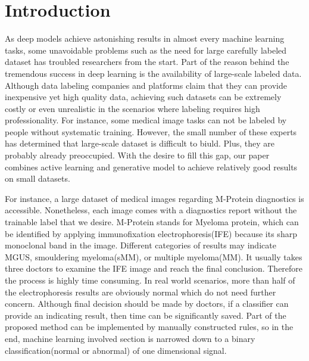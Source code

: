 \documentclass[10pt,twocolumn,letterpaper]{article}
\begin{document}
\section{Introduction}

\par As deep models achieve astonishing results in almost every machine learning tasks, some unavoidable problems such as the need for large carefully labeled dataset has troubled researchers from the start. Part of the reason behind the tremendous success in deep learning is the availability of large-scale labeled data\cite{sun2017revisiting}. Although data labeling companies and platforms claim that they can provide inexpensive yet high quality data\cite{buhrmester2011amazon}, achieving such datasets can be extremely costly or even unrealistic in the scenarios where labeling requires high professionality. For instance, some medical image tasks can not be labeled by people without systematic training. However, the small number of these experts has determined that large-scale dataset is difficult to biuld. Plus, they are probably already preoccupied. With the desire to fill this gap, our paper combines active learning and generative model to achieve relatively good results on small datasets.

For instance, a large dataset of medical images regarding M-Protein diagnostics is accessible. Nonetheless, each image comes with a diagnostics report without the trainable label that we desire. M-Protein stands for Myeloma protein, which can be identified by applying immunofixation electrophoresis(IFE) because its sharp monoclonal band in the image. Different categories of results may indicate MGUS, smouldering myeloma(sMM), or multiple myeloma(MM). It usually takes three doctors to examine the IFE image and reach the final conclusion. Therefore the process is highly time consuming. In real world scenarios, more than half of the electrophoresis results are obviously normal which do not need further concern. Although final decision should be made by doctors, if a classifier can provide an indicating result, then time can be significantly saved. Part of the proposed method can be implemented by manually constructed rules, so in the end, machine learning involved section is narrowed down to a binary classification(normal or abnormal) of one dimensional signal.
\end{document}
